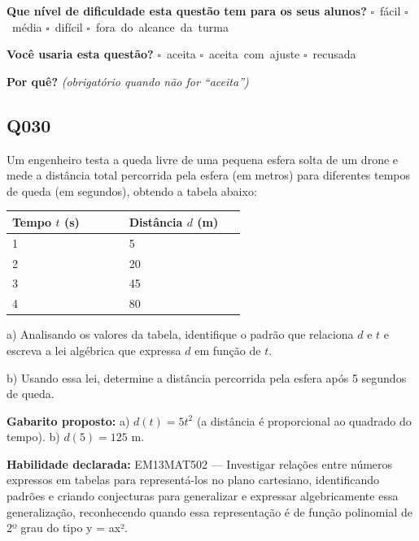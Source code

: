 \documentclass[11pt,a4paper]{article}
\begin{document}
\textbf{Que nível de dificuldade esta questão tem para os seus alunos?}\quad
\mbox{$\square$~fácil} \quad \mbox{$\square$~média} \quad
\mbox{$\square$~difícil} \quad \mbox{$\square$~fora do alcance da turma}

\textbf{Você usaria esta questão?}\quad
\mbox{$\square$~aceita} \quad \mbox{$\square$~aceita com ajuste} \quad
\mbox{$\square$~recusada}

\textbf{Por quê?} \emph{(obrigatório quando não for ``aceita'')}

\underline{\hspace{\linewidth}}

\underline{\hspace{\linewidth}}
\vspace{0.6em}

\begin{samepage}
\subsection*{Q030}
Um engenheiro testa a queda livre de uma pequena esfera solta de um drone e mede a distância total percorrida pela esfera (em metros) para diferentes tempos de queda (em segundos), obtendo a tabela abaixo:

\begin{center}
\begin{tabular}{|p{0.430\linewidth}|p{0.430\linewidth}|}
\hline
\textbf{Tempo $t$ (s)} & \textbf{Distância $d$ (m)} \\
\hline
1 & 5 \\
\hline
2 & 20 \\
\hline
3 & 45 \\
\hline
4 & 80 \\
\hline
\end{tabular}
\end{center}

a) Analisando os valores da tabela, identifique o padrão que relaciona $d$ e $t$ e escreva a lei algébrica que expressa $d$ em função de $t$.

b) Usando essa lei, determine a distância percorrida pela esfera após 5 segundos de queda.

\textbf{Gabarito proposto:} a) $d(t) = 5t^2$ (a distância é proporcional ao quadrado do tempo). b) $d(5) = 125$ m.

\textbf{Habilidade declarada:} EM13MAT502 --- Investigar relações entre números expressos em tabelas para representá-los no plano cartesiano, identificando padrões e criando conjecturas para generalizar e expressar algebricamente essa generalização, reconhecendo quando essa representação é de função polinomial de 2º grau do tipo y = ax².
\end{samepage}
\end{document}
